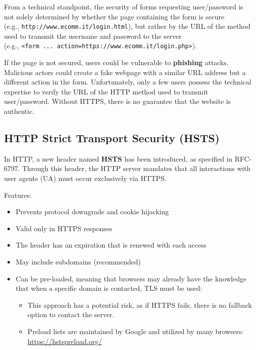 From a technical standpoint, the security of forms requesting user/password is not solely determined by whether the page containing the form is secure \\
(e.g., \texttt{http://www.ecomm.it/login.html}),
but rather by the URL of the method used to transmit the username and password to the server \\
(e.g., \texttt{<form ... action=http\emph{s}://www.ecomm.it/login.php>}).

If the page is not secured, users could be vulnerable to \textbf{phishing} attacks. Malicious actors could create a fake webpage with a similar URL address but a different action in the form. Unfortunately, only a few users possess the technical expertise to verify the URL of the HTTP method used to transmit user/password. Without HTTPS, there is no guarantee that the website is authentic.


\subsection{HTTP Strict Transport Security (HSTS)}

In HTTP, a new header named \textbf{HSTS} has been introduced, as specified in RFC-6797. Through this header, the HTTP server mandates that all interactions with user agents (UA) must occur exclusively via HTTPS.

Features:
\begin{itemize}
	\item Prevents protocol downgrade and cookie hijacking
	\item Valid only in HTTPS responses
	\item The header has an expiration that is renewed with each access
	\item May include subdomains (recommended)
	\item Can be pre-loaded, meaning that browsers may already have the knowledge that when a specific domain is contacted, TLS must be used:
	      \begin{itemize}
		      \item This approach has a potential risk, as if HTTPS fails, there is no fallback option to contact the server.
		      \item Preload lists are maintained by Google and utilized by many browsers: \url{https://hstspreload.org/}
	      \end{itemize}
\end{itemize}



